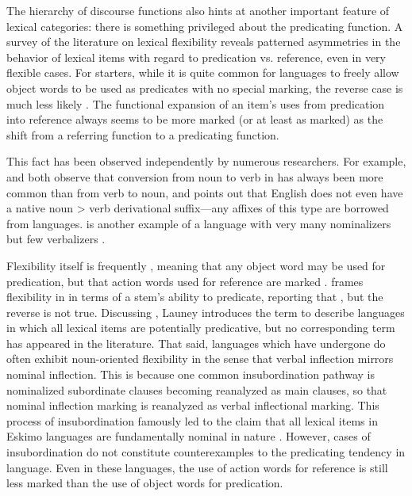 The hierarchy of discourse functions also hints at another important feature of lexical categories: there is something privileged about the predicating function. A survey of the literature on lexical flexibility reveals patterned asymmetries in the behavior of lexical items with regard to predication vs. reference, even in very flexible cases. For starters, while it is quite common for languages to freely allow object words to be used as predicates with no special marking, the reverse case is much less likely \parencite[745]{HopperThompson1984}. The functional expansion of an item's uses from predication into reference always seems to be more marked (or at least as marked) as the shift from a referring function to a predicating function.

This fact has been observed independently by numerous researchers. For example, \textcite[251]{Stevick1968} and \textcite[373--374]{Marchand1969} both observe that conversion from noun to verb in  has always been more common than from verb to noun, and \textcite[98]{Kastovsky1996} points out that English does not even have a native noun > verb derivational suffix—any affixes of this type are borrowed from  languages.  is another example of a language with very many nominalizers but few verbalizers \parencite[158]{Mithun2017}.

Flexibility itself is frequently , meaning that any object word may be used for predication, but that action words used for reference are marked \parencites[69]{Croft2001b}[§3.3]{EvansOsada2005}{Beck2013}. \textcite[44]{Nakayama2001} frames flexibility in  in terms of a stem's ability to predicate, reporting that , but the reverse is not true. Discussing , Launey \parencites*{Launey1994}{Launey2004} introduces the term  to describe languages in which all lexical items are potentially predicative, but no corresponding term  has appeared in the literature. That said, languages which have undergone   do often exhibit noun-oriented flexibility in the sense that verbal inflection mirrors nominal inflection. This is because one common insubordination pathway is nominalized subordinate clauses becoming reanalyzed as main clauses, so that nominal inflection marking is reanalyzed as verbal inflectional marking. This process of insubordination famously led to the claim that all lexical items in Eskimo languages are fundamentally nominal in nature \parencite{Sadock1999}. However, cases of insubordination do not constitute counterexamples to the predicating tendency in language. Even in these languages, the use of action words for reference is still less marked than the use of object words for predication.

